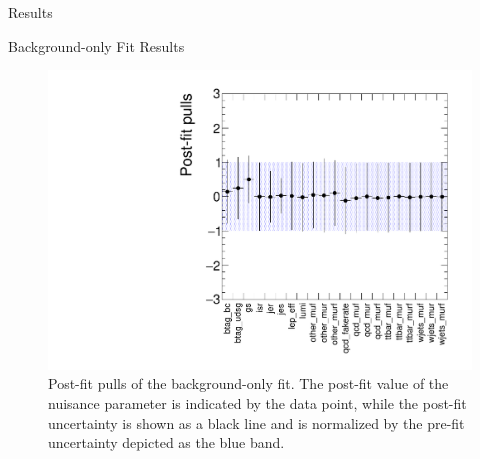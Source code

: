 \begin{section}{Results}
\begin{subsection}{Background-only Fit Results}
\begin{figure}[tbp!]
\centering
\includegraphics[angle=0,width=0.80\columnwidth]{fig/bonly_pulls.pdf}
\caption{Post-fit pulls of the background-only fit.
The post-fit value of the nuisance parameter is indicated by the data point, while the post-fit uncertainty is shown as a black line and is normalized by the pre-fit uncertainty depicted as the blue band.}
\label{fig:bonly_pulls}
\end{figure}


\end{subsection}
\end{section}
